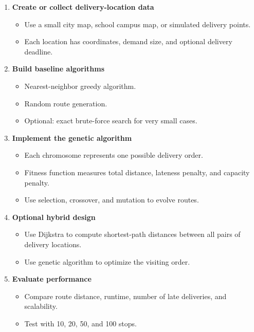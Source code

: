 \documentclass[11pt,a4paper]{article}
\begin{document}
\begin{enumerate}
    \item \textbf{Create or collect delivery-location data}
    \begin{itemize}
        \item Use a small city map, school campus map, or simulated delivery points.
        \item Each location has coordinates, demand size, and optional delivery deadline.
    \end{itemize}

    \item \textbf{Build baseline algorithms}
    \begin{itemize}
        \item Nearest-neighbor greedy algorithm.
        \item Random route generation.
        \item Optional: exact brute-force search for very small cases.
    \end{itemize}

    \item \textbf{Implement the genetic algorithm}
    \begin{itemize}
        \item Each chromosome represents one possible delivery order.
        \item Fitness function measures total distance, lateness penalty, and capacity penalty.
        \item Use selection, crossover, and mutation to evolve routes.
    \end{itemize}

    \item \textbf{Optional hybrid design}
    \begin{itemize}
        \item Use Dijkstra to compute shortest-path distances between all pairs of delivery locations.
        \item Use genetic algorithm to optimize the visiting order.
    \end{itemize}

    \item \textbf{Evaluate performance}
    \begin{itemize}
        \item Compare route distance, runtime, number of late deliveries, and scalability.
        \item Test with 10, 20, 50, and 100 stops.
    \end{itemize}
\end{enumerate}
\end{document}
